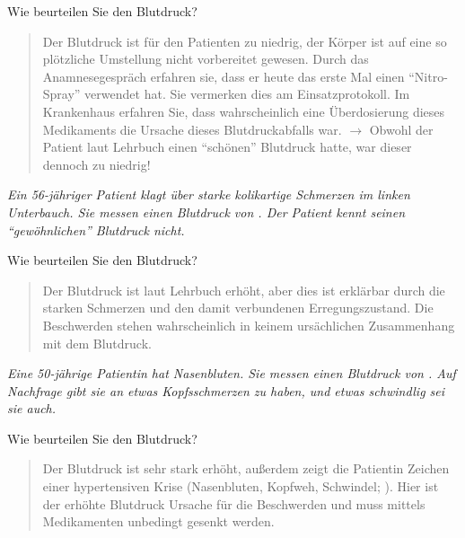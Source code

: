 {Wie beurteilen Sie den Blutdruck?

\begin{quote}
Der Blutdruck ist für den Patienten zu niedrig, der Körper
ist auf eine so plötzliche Umstellung nicht vorbereitet
gewesen. Durch das Anamnesegespräch erfahren sie, dass er
heute das erste Mal einen \enquote{Nitro-Spray} verwendet hat. Sie
vermerken dies am Einsatzprotokoll. Im Krankenhaus erfahren
Sie, dass wahrscheinlich eine Überdosierung dieses
Medikaments die Ursache dieses Blutdruckabfalls war.
${\rightarrow}$ Obwohl der Patient laut Lehrbuch einen
\enquote{schönen} Blutdruck hatte, war dieser dennoch zu niedrig!
\end{quote}

\emph{Ein 56-jähriger Patient klagt über starke kolikartige
Schmerzen im linken Unterbauch. Sie messen einen Blutdruck
von . Der Patient kennt seinen
\enquote{gewöhnlichen} Blutdruck
nicht.}  

Wie beurteilen Sie den Blutdruck?

\begin{quote}
Der Blutdruck ist laut Lehrbuch erhöht, aber dies ist
erklärbar durch die starken Schmerzen und den damit
verbundenen Erregungszustand. Die Beschwerden stehen
wahrscheinlich in
keinem ursächlichen Zusammenhang mit dem Blutdruck.
\end{quote}

\emph{Eine 50-jährige Patientin hat Nasenbluten. Sie
messen einen Blutdruck von . Auf Nachfrage gibt sie an
etwas Kopfsschmerzen zu haben, und etwas schwindlig sei sie auch.} 

Wie beurteilen Sie den Blutdruck? 

\begin{quote}
Der Blutdruck ist sehr stark erhöht, außerdem zeigt die
Patientin Zeichen einer hypertensiven Krise (Nasenbluten,
Kopfweh, Schwindel;
).
Hier ist der erhöhte Blutdruck Ursache für die Beschwerden
und muss mittels Medikamenten unbedingt gesenkt werden.
\end{quote}

}
